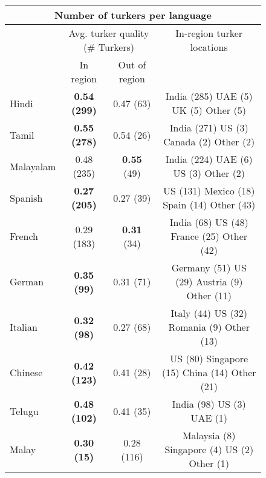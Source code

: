 \begin{figure}[h]
\centering
\begin{tabular}{lccc}
\multicolumn{4}{c}{Number of turkers per language}\\
\hline\hline
&\multicolumn{2}{c}{Avg. turker quality (\# Turkers)}&In-region turker locations\\
&In region&Out of region\\
\hline\hline
Hindi&\textbf{0.54 (299)}&0.47 (63)&India (285) UAE (5) UK (5) Other (5) \\
Tamil&\textbf{0.55 (278)}&0.54 (26)&India (271) US (3) Canada (2) Other (2) \\
Malayalam&0.48 (235) &\textbf{0.55} (49)&India (224) UAE (6) US (3) Other (2) \\
Spanish&\textbf{0.27 (205)}&0.27 (39)&US (131) Mexico (18) Spain (14) Other (43) \\
French&0.29 (183) &\textbf{0.31} (34)&India (68) US (48) France (25) Other (42) \\
German&\textbf{0.35 (99)}&0.31 (71)&Germany (51) US (29) Austria (9) Other (11) \\
Italian&\textbf{0.32 (98)}&0.27 (68)&Italy (44) US (32) Romania (9) Other (13) \\
Chinese&\textbf{0.42 (123)}&0.41 (28)&US (80) Singapore (15) China (14) Other (21) \\
Telugu&\textbf{0.48 (102)}&0.41 (35)&India (98) US (3) UAE (1) \\
Malay&\textbf{0.30 (15)}&0.28 (116)&Malaysia (8) Singapore (4) US (2) Other (1) \\
\hline\hline
\end{tabular}
\end{figure}

